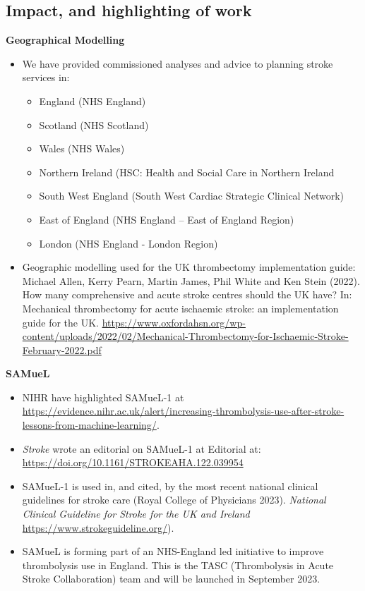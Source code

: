\subsection{Impact, and highlighting of work}

\textbf{Geographical Modelling}

\begin{itemize}

    \item We have provided commissioned analyses and advice to planning stroke services in:

    \begin{itemize}
        \item England (NHS England)
        \item Scotland (NHS Scotland)
        \item Wales (NHS Wales)
        \item Northern Ireland (HSC: Health and Social Care in Northern Ireland
        \item South West England (South West Cardiac Strategic Clinical Network)
        \item East of England (NHS England – East of England Region)
        \item London (NHS England - London Region)
    \end{itemize}

    \item Geographic modelling used for the UK thrombectomy implementation guide: Michael Allen, Kerry Pearn, Martin James, Phil White and Ken Stein (2022). How many comprehensive and acute stroke centres should the UK have? In: Mechanical thrombectomy for acute ischaemic stroke: an implementation guide for the UK. \url{https://www.oxfordahsn.org/wp-content/uploads/2022/02/Mechanical-Thrombectomy-for-Ischaemic-Stroke-February-2022.pdf}

\end{itemize}

\textbf{SAMueL}

\begin{itemize}
    \item NIHR have highlighted SAMueL-1 at \url{https://evidence.nihr.ac.uk/alert/increasing-thrombolysis-use-after-stroke-lessons-from-machine-learning/}. 
    \item \textit{Stroke} wrote an editorial on SAMueL-1 at Editorial at: \url{https://doi.org/10.1161/STROKEAHA.122.039954}
    \item SAMueL-1 is used in, and cited, by the most recent national clinical guidelines for stroke care (Royal College of Physicians 2023). \textit{National Clinical Guideline for Stroke for the UK and Ireland} \url{https://www.strokeguideline.org/}).
    \item SAMueL is forming part of an NHS-England led initiative to improve thrombolysis use in England. This is the TASC (Thrombolysis in Acute Stroke Collaboration) team and will be launched in September 2023.
\end{itemize}

